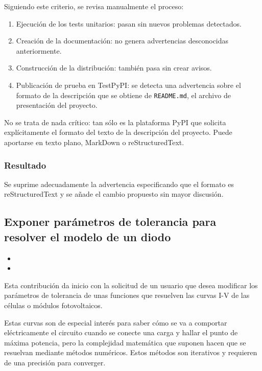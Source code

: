 Siguiendo este criterio, se revisa manualmente el proceso:

\begin{enumerate}
    \item Ejecución de los tests unitarios: pasan sin nuevos problemas detectados.
    \item Creación de la documentación: no genera advertencias desconocidas anteriormente.
    \item Construcción de la distribución: también pasa sin crear avisos.
    \item Publicación de prueba en TestPyPI: se detecta una advertencia sobre el formato de la descripción que se obtiene de \texttt{README.md}, el archivo de presentación del proyecto.
\end{enumerate}

No se trata de nada crítico: tan sólo es la plataforma PyPI que solicita explícitamente el formato del texto de la descripción del proyecto. Puede aportarse en texto plano, MarkDown o \gls{reStructuredText}.

\subsubsection{Resultado}

Se suprime adecuadamente la advertencia especificando que el formato es reStructuredText y se añade el cambio propuesto sin mayor discusión.

\subsection{Exponer parámetros de tolerancia para resolver el modelo de un diodo}

\begin{itemize}
    \item {}
    \item {}
\end{itemize}

Esta contribución da inicio con la solicitud de un usuario que desea modificar los parámetros de tolerancia de unas funciones que resuelven las curvas I-V de las células o módulos fotovoltaicos.

Estas curvas son de especial interés para saber cómo se va a comportar eléctricamente el circuito cuando se conecte una \gls{carga} y hallar el punto de máxima potencia, pero la complejidad matemática que suponen hacen que se resuelvan mediante métodos numéricos. Estos métodos son iterativos y requieren de una precisión para converger.

